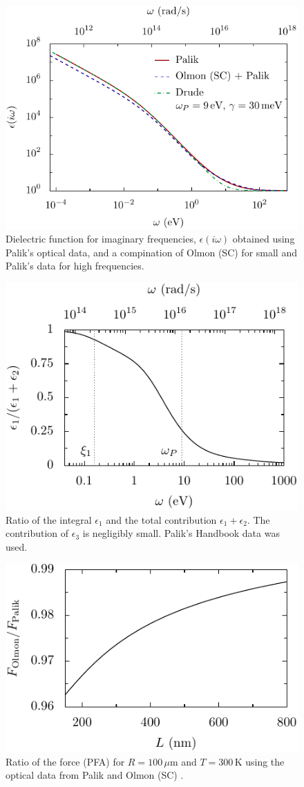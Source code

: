 \documentclass[twocolumn,superscriptaddress,pre]{revtex4-1}
\begin{document}
\begin{figure}
\includegraphics[width=0.95\columnwidth]{img/eps_imag.pdf}
\caption{Dielectric function for imaginary frequencies, $\epsilon(i\omega)$
obtained using Palik's optical data, and a compination of Olmon (SC) for small
and Palik's data for high frequencies.}
\label{fig:eps_imag}
\end{figure}

\begin{figure}
\includegraphics[width=0.7\columnwidth]{img/ratio.pdf}
\caption{Ratio of the integral $\epsilon_1$ and the total contribution
$\epsilon_1+\epsilon_2$. The contribution of $\epsilon_3$ is negligibly small. Palik's Handbook data was used.}
\label{fig:ratio}
\end{figure}

\begin{figure}
\includegraphics[width=0.7\columnwidth]{img/diff.pdf}
\caption{Ratio of the force (PFA) for $R=100\,\mu$m and $T=300\,$K using the optical data from Palik \cite{Palik1995} and Olmon (SC) \cite{Olmon2012}.}
\label{fig:diff}
\end{figure}
\end{document}

